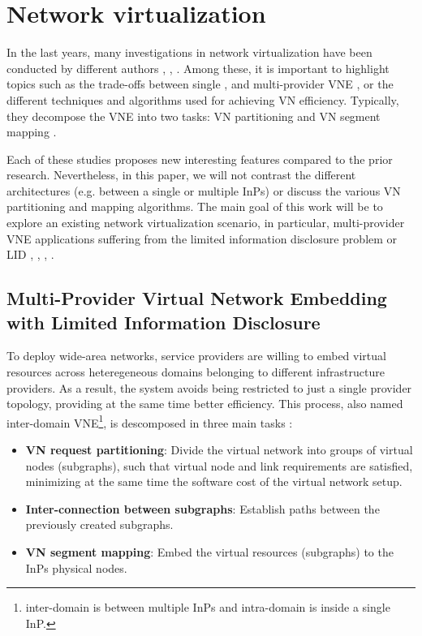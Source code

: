 \section{Network virtualization}

In the last years, many investigations in network virtualization have been conducted by different authors \citep{houidi2011virtual}, \citep{zhu2008cabernet}, \citep{chowdhury2009virtual}. Among these, it is important to highlight topics such as the trade-offs between single \citep{chowdhury2009virtual}, \citep{houidi2008distributed} and multi-provider VNE \citep{dietrich2017multi}, or the different techniques and algorithms used for achieving VN efficiency. Typically, they decompose the VNE into two tasks: VN partitioning and VN segment mapping \citep{fischer2013virtual}. 

Each of these studies proposes new interesting features compared to the prior research. Nevertheless, in this paper, we will not contrast the different architectures (e.g. between a single or multiple InPs) or discuss the various VN partitioning and mapping algorithms. The main goal of this work will be to explore an existing network virtualization scenario, in particular, multi-provider VNE applications suffering from the limited information disclosure problem or LID \citep{dietrich2017multi}, \citep{zaheer2010multi}, \citep{esposito2013general}, \citep{chowdhury2010polyvine}.

\subsection{Multi-Provider Virtual Network Embedding with Limited Information Disclosure}

To deploy wide-area networks, service providers are willing to embed virtual resources across heteregeneous domains belonging to different infrastructure providers. As a result, the system avoids being restricted to just a single provider topology, providing at the same time better efficiency. This process, also named inter-domain VNE\footnote{inter-domain is between multiple InPs and intra-domain is inside a single InP.}, is descomposed in three main tasks \citep{chowdhury2010polyvine}:

\begin{itemize}
	\item \textbf{VN request partitioning}: Divide the virtual network into groups of virtual nodes (subgraphs), such that virtual node and link requirements are satisfied, minimizing at the same time the software cost of the virtual network setup.
		\item \textbf{Inter-connection between subgraphs}: Establish paths between the previously created subgraphs.
	\item \textbf{VN segment mapping}: Embed the virtual resources (subgraphs) to the InPs physical nodes.
\end{itemize}

